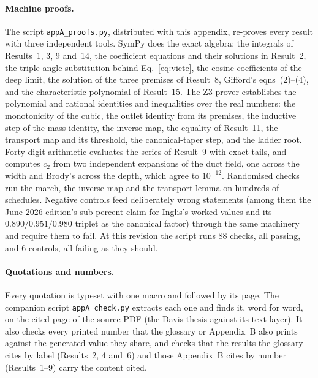 \paragraph{Machine proofs.} The script \texttt{appA\_proofs.py}, distributed with this appendix,
re-proves every result with three independent tools. SymPy does the exact algebra: the integrals
of Results~1, 3, 9 and~14, the coefficient equations and their solutions in Result~2, the
triple-angle substitution behind Eq.~\eqref{eq:viete}, the cosine coefficients of the deep limit,
the solution of the three premises of Result~8, Gifford's eqns~(2)--(4), and the characteristic
polynomial of Result~15. The Z3 prover establishes the polynomial and rational identities and
inequalities over the real numbers: the monotonicity of the cubic, the outlet identity from its
premises, the inductive step of the mass identity, the inverse map, the equality of Result~11,
the transport map and its threshold, the canonical-taper step, and the ladder root. Forty-digit
arithmetic evaluates the series of Result~9 with exact tails, and computes $c_2$ from two
independent expansions of the duct field, one across the width and Brody's across the depth,
which agree to $10^{-12}$. Randomised checks run the march, the inverse map and the transport
lemma on hundreds of schedules. Negative controls feed deliberately wrong statements (among
them the June 2026 edition's sub-percent claim for Inglis's worked values and its
$0.890/0.951/0.980$ triplet as the canonical factor) through the same machinery and require
them to fail. At this revision the script runs 88 checks, all passing, and 6 controls, all
failing as they should.

\paragraph{Quotations and numbers.} Every quotation is typeset with one macro and followed by
its page. The companion script \texttt{appA\_check.py} extracts each one and finds it, word for
word, on the cited page of the source PDF (the Davis thesis against its text layer). It also
checks every printed number that the glossary or Appendix~B also prints against the generated
value they share, and checks that the results the glossary cites by label (Results~2, 4 and~6)
and those Appendix~B cites by number (Results~1--9) carry the content cited.

